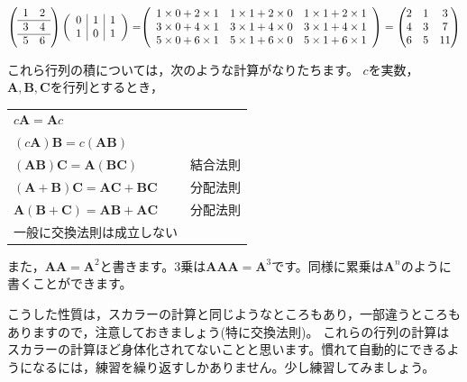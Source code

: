 \documentclass{ltjsbook}
\begin{document}
\begin{equation*}
	\left(
	\begin{array}{cc}
		1 & 2 \\\hline
		3 & 4 \\\hline
		5 & 6 \\
	\end{array}
	\right)
	\left(
	\begin{array}{c|c|c}
		0 & 1 & 1 \\
		1 & 0 & 1
	\end{array}
	\right)
	=
	$$
	$$
	\left(
	\begin{array}{ccc}
		1 \times 0 + 2 \times 1 & 1 \times 1 + 2 \times 0 & 1 \times 1+2\times 1 \\
		3 \times 0 + 4 \times 1 & 3 \times 1 + 4 \times 0 & 3 \times 1+4\times 1 \\
		5 \times 0 + 6 \times 1 & 5 \times 1 + 6 \times 0 & 5 \times 1+6\times 1 \\
	\end{array}
	\right)
	=
	\begin{pmatrix}
		2 & 1 & 3  \\
		4 & 3 & 7  \\
		6 & 5 & 11
	\end{pmatrix}
\end{equation*}


これら行列の積については，次のような計算がなりたちます。
$c$を実数，$\bm{A},\bm{B},\bm{C}$を行列とするとき，

\begin{center}
	\begin{tabular}{lr}
		$c\bm{A} = \bm{A}c$                          &      \\
		$(c\bm{A})\bm{B} = c(\bm{AB})$               &      \\
		$(\bm{AB})\bm{C} = \bm{A}(\bm{BC})$          & 結合法則 \\
		$(\bm{A}+\bm{B})\bm{C} = \bm{AC} + \bm{BC} $ & 分配法則 \\
		$\bm{A}(\bm{B}+\bm{C}) = \bm{AB} + \bm{AC} $ & 分配法則 \\
		一般に交換法則は成立しない                                &      \\
	\end{tabular}
\end{center}

また，$\bm{AA} = \bm{A}^2$と書きます。3乗は$\bm{AAA}=\bm{A}^3$です。同様に累乗は$\bm{A}^n$のように書くことができます。

こうした性質は，スカラーの計算と同じようなところもあり，一部違うところもありますので，注意しておきましょう(特に交換法則)。
これらの行列の計算はスカラーの計算ほど身体化されてないことと思います。慣れて自動的にできるようになるには，練習を繰り返すしかありません。少し練習してみましょう。
\end{document}

